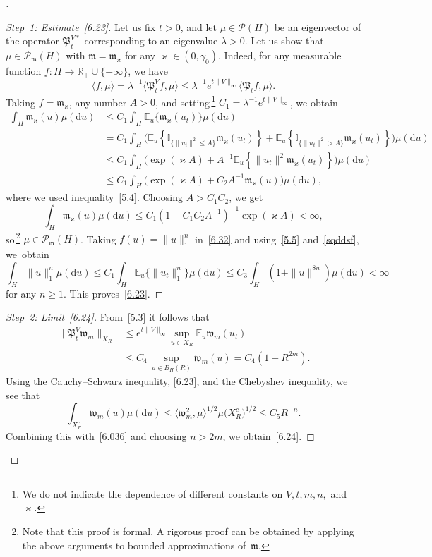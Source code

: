 \documentclass[10pt]{amsart}
\theoremstyle{definition}\newtheorem{defi}[theo]{Definition}\newtheorem{rema}[theo]{Remark}\newtheorem{exam}[theo]{Example}\newtheorem{exem}[theo]{Example}\newtheorem{nota}[theo]{Notation}
\newcommand{\R}{{\mathbb R}}
\newcommand{\I}{{\mathbb I}}
\newcommand{\E}{{\mathbb E}}
\newcommand{\PP}{{\mathcal P}}
\newcommand{\vk}{{\varkappa}}
\newcommand{\la}{\lambda}
\newcommand{\ty}{\infty}
\newcommand{\wwww}{{\mathfrak w}}
\newcommand{\mm}{{\mathfrak m}}
\newcommand{\PPPP}{{\mathfrak P}}
\newcommand{\lag}{\langle}
\newcommand{\rag}{\rangle}
\newcommand{\dd}{\mathrm{d}}
\newenvironment{step}{\begin{proof}}{\let\qed\relax \end{proof}}
\newenvironment{proofc}[1][\proofname]{\begin{proof}[{#1}]}{\end{proof}}
\begin{document}
\begin{proofc}

\begin{step}[Step~1: Estimate~\eqref{6.23}]
Let us fix $t>0$, and let $\mu \in \PP(H)$ be an eigenvector of the operator $\PPPP_t^{V*}$ corresponding to an eigenvalue $\la>0$. Let us show that $\mu \in \PP_{\mm}(H)$ with $\mm=\mm_\vk$ for any $\vk\in (0,\gamma_0)$. Indeed, for any measurable function $f:H\to\R_+\cup\{+\ty\}$, we have
\begin{equation}
\lag f, \mu\rag=\lambda^{-1}\lag \PPPP_t^Vf, \mu\rag \le \lambda^{-1}e^{t\|V\|_\infty}\lag \PPPP_tf, \mu\rag.\label{6.32}
\end{equation}
Taking $f=\mm_\vk$, any number $A>0$, and setting\,\footnote{We do not indicate the dependence of different constants on $V,t,m,n,$ and $\vk$.} $C_1= \lambda^{-1}e^{t\|V\|_\infty}$, we obtain
\begin{align*}
\int_{H} \mm_\vk(u) \mu(\dd u)&\le C_1 \int_{H} \E_u \{\mm_{\vk}(u_t)\}\mu(\dd u) \\&=C_1 \!\!\int_{H}\!\!\Big(\E_u \left\{ \I_{\{\|u_t\|^2\le A\}} \mm_\varkappa(u_t) \right\}
\!+\! \E_u \left\{ \I_{\{\|u_t\|^2> A\}} \mm_\varkappa(u_t) \right\}\!\Big)\mu(\dd u)\\&\le C_1 \int_{H}\big(\exp(\vk A)+A^{-1} \E_u \left\{ \|u_t\|^2 \mm_\varkappa(u_t) \right\}\big)\mu(\dd u)\\&\le C_1 \int_{H}\big(\exp(\vk A)+C_2A^{-1} \mm_\vk(u)\big)\mu(\dd u),
\end{align*}
where we used inequality~\eqref{5.4}. Choosing $A>C_1C_2$, we get
\begin{equation}\label{sqddsf}
\int_{H} \mm_\vk(u) \mu(\dd u)\le C_1(1- C_1C_2 A^{-1})^{-1}\exp(\vk A)<\ty,
\end{equation}
so\,\footnote{Note that this proof is formal. A rigorous proof can be obtained by applying the above arguments to bounded approximations of~$\mm$.} $\mu\in \PP_\mm(H)$. Taking $f(u)=\|u\|_1^n $ in~\eqref{6.32} and using~\eqref{5.5} and~\eqref{sqddsf}, we~obtain
\[
\int_{H} \|u\|_1^n \mu(\dd u) \le C_1 \int_{H} \E_u \{\|u_t\|_1^n\}\mu(\dd u) \le C_3 \int_{H} (1+\|u\|^{8n})\mu(\dd u)<\ty
\]
for any $n\ge1$. This proves~\eqref{6.23}.
\end{step}

\begin{step}[Step~2: Limit~\eqref{6.24}]
From~\eqref{5.3} it follows that
\begin{align}\label{6.036}
\|\PPPP_t^V\wwww_m\|_{X_R}&\le e^{t\|V\|_\infty}\sup_{u\in X_R}\E_u\wwww_m(u_t)\nonumber\\&
\le C_4 \,\sup_{u\in B_H(R)}\wwww_m(u)= C_4(1+ R^{2m}).
\end{align}
Using the Cauchy--Schwarz inequality, \eqref{6.23}, and the Chebyshev inequality, we see that
\[
\int_{X_R^c}\wwww_m(u)\mu(\dd u)
\le \langle\wwww_m^2,\mu\rangle^{1/2} \mu\bigl(X_R^c\bigr)^{1/2}\le C_{5}R^{-n}.
\]
Combining this with~\eqref{6.036} and choosing $n>2m$, we obtain~\eqref{6.24}.
\end{step}


\end{proofc}
\end{document}
